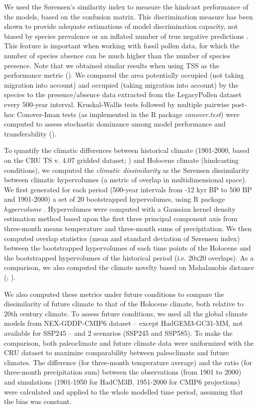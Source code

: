 We used the Sørensen's similarity index to measure the hindcast performance of the models, based on the confusion matrix. This discrimination measure has been shown to provide adequate estimations of model discrimination capacity,  not biased by species prevalence or an inflated number of true negative predictions \citep{Leroy2018}. This feature is important when working with fossil pollen data, for which the number of species absence can be much higher than the number of species presence. Note that we obtained similar results when using TSS as the performance metric (). We compared the area potentially occupied (not taking migration into account) and occupied (taking migration into account) by the species to the presence/absence data extracted from the LegacyPollen dataset every 500-year interval. Kruskal-Wallis tests followed by multiple pairwise post-hoc Conover-Iman tests (as implemented in the R package \emph{conover.test}) were computed to assess stochastic dominance among model performance and transferability ().

To quantify the climatic differences between  historical climate (1901-2000, based on the CRU TS v. 4.07 gridded dataset; \citealp{Harris2020}) and Holocene climate (hindcasting conditions), we computed the \emph{climatic dissimilarity} as the Sørensen dissimilarity between climatic hypervolumes (a metric of overlap in multidimensional space). We first generated for each period (500-year intervals from -12 kyr BP to 500 BP and 1901-2000) a set of 20 bootstrapped hypervolumes, using R package \emph{hypervolume} \citep{Blonder2018}. Hypervolumes were computed with a Gaussian kernel density estimation method based upon the first three principal component axis from three-month means temperature and three-month sums of precipitation. We then computed overlap statistics (mean and standard deviation of Sørensen index) between the bootstrapped hypervolumes of each time points of the Holocene and the bootstrapped hypervolumes of the historical period (i.e. 20x20 overlaps). As a comparison, we also computed the climate novelty based on Mahalanobis distance (; \citealp{Burke2019}).

We also computed these metrics under future conditions to compare the dissimilarity of future climate to that of  the Holocene climate, both relative to 20th century climate. To assess future conditions, we used all the global climate models from NEX-GDDP-CMIP6 dataset \citep{Thrasher2022} -- except HadGEM3-GC31-MM, not available for SSP245 -- and 2 scenarios (SSP245 and SSP585). To make the comparison, both paleoclimate and future climate data were uniformized with the CRU dataset to maximize comparability between paleoclimate and future climates. The difference (for three-month temperature average) and the ratio (for three-month precipitation sum) between the observations (from 1901 to 2000) and simulations (1901-1950 for HadCM3B, 1951-2000 for CMIP6 projections) were calculated and applied to the whole modelled time period, assuming that the bias was constant. 

